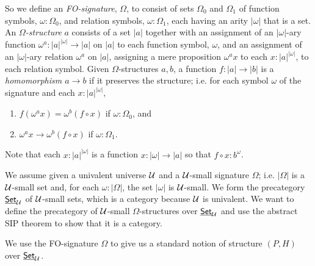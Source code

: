 So we define an {\em FO-signature}, $\Omega$, to consist of sets $\Omega_0$ and $\Omega_1$ of function symbols, $\omega:\Omega_0$, and relation symbols, $\omega:\Omega_1$, each having an arity $|\omega|$ that is a set.  An {\em $\Omega$-structure} $a$ consists of a set $|a|$ together with an assignment of an $|\omega|$-ary function $\omega^a:|a|^{|\omega|}\to |a|$ on $|a|$ to each function symbol, $\omega$, and an assignment of an $|\omega|$-ary relation $\omega^a$ on $|a|$, assigning a mere proposition $\omega^ax$ to each $x:|a|^{|\omega|}$, to each relation symbol.  Given $\Omega$-structures $a,b$, a function $f:|a|\to |b|$ is a {\em homomorphism $a\to b$} if it preserves the structure; i.e. for each symbol $\omega$ of the signature and each $x:|a|^{|\omega|}$,
\begin{enumerate}
\item $f(\omega^ax) = \omega^b(f\circ x)$ if $\omega:\Omega_0$, and
\item $\omega^ax\to\omega^b(f\circ x)$ if $\omega:\Omega_1$.
\end{enumerate}
Note that each $x:|a|^{|\omega|}$ is a function $x:|\omega|\to |a|$ so that $f\circ x : b^\omega$.

We assume given a univalent universe $\mathcal{U}$ and a $\mathcal{U}$-small signature $\Omega$; i.e. $|\Omega|$ is a $\mathcal{U}$-small set and, for each $\omega:|\Omega|$, the set $|\omega|$ is $\mathcal{U}$-small.  We form the precategory $\underline{\mathsf{Set}}_\mathcal{U}$ of $\mathcal{U}$-small sets, which is a category because $\mathcal{U}$ is univalent.  We want to define the precategory of $\mathcal{U}$-small $\Omega$-structures over $\underline{\mathsf{Set}}_\mathcal{U}$ and use the abstract SIP theorem to show that it is a category.

We use the FO-signature $\Omega$ to give us a standard notion of structure $(P,H)$ over $\underline{\mathsf{Set}}_\mathcal{U}$.  

